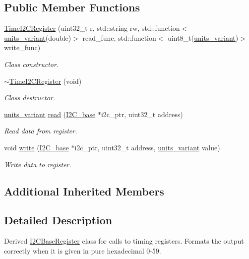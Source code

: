 \subsection*{Public Member Functions}
\begin{DoxyCompactItemize}
\item 
\hyperlink{class_time_i2_c_register_a0b88982b1be400cba6684ed53019413a}{Time\+I2\+C\+Register} (uint32\+\_\+t r, std\+::string rw, std\+::function$<$ \hyperlink{units__define_8hpp_a95d46867fa79633565c288a0b4bd5408}{units\+\_\+variant}(double)$>$ read\+\_\+func, std\+::function$<$ uint8\+\_\+t(\hyperlink{units__define_8hpp_a95d46867fa79633565c288a0b4bd5408}{units\+\_\+variant})$>$ write\+\_\+func)
\begin{DoxyCompactList}\small\item\em Class constructor. \end{DoxyCompactList}\item 
\hyperlink{class_time_i2_c_register_a997bf1e5e4fafb70d9499ff0cca41581}{$\sim$\+Time\+I2\+C\+Register} (void)
\begin{DoxyCompactList}\small\item\em Class destructor. \end{DoxyCompactList}\item 
\hyperlink{units__define_8hpp_a95d46867fa79633565c288a0b4bd5408}{units\+\_\+variant} \hyperlink{class_time_i2_c_register_a0b4f819644bed5adc645a089aec521da}{read} (\hyperlink{class_i2_c__base}{I2\+C\+\_\+base} $\ast$i2c\+\_\+ptr, uint32\+\_\+t address)
\begin{DoxyCompactList}\small\item\em Read data from register. \end{DoxyCompactList}\item 
void \hyperlink{class_time_i2_c_register_a49301d14f0d10afa0f0ad7edeb6b30a7}{write} (\hyperlink{class_i2_c__base}{I2\+C\+\_\+base} $\ast$i2c\+\_\+ptr, uint32\+\_\+t address, \hyperlink{units__define_8hpp_a95d46867fa79633565c288a0b4bd5408}{units\+\_\+variant} value)
\begin{DoxyCompactList}\small\item\em Write data to register. \end{DoxyCompactList}\end{DoxyCompactItemize}
\subsection*{Additional Inherited Members}


\subsection{Detailed Description}
Derived \hyperlink{class_i2_c_base_register}{I2\+C\+Base\+Register} class for calls to timing registers. Formats the output correctly when it is given in pure hexadecimal 0-\/59. 

